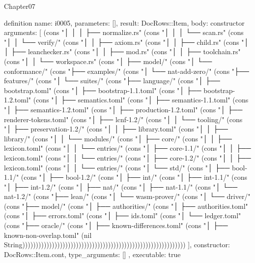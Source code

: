 \begin{lexlean}{Chapter07}
\begin{semanticmodule}
definition{
  name: i0005,
  parameters: [],
  result: DocRows::Item,
  body: constructor{
    arguments: [
      (cons "│   │       │   ├── normalize.rs" (cons "│   │       │   └── scan.rs" (cons "│   │       └── verify/" (cons "│   │           ├── axiom.rs" (cons "│   │           ├── child.rs" (cons "│   │           ├── leanchecker.rs" (cons "│   │           ├── mod.rs" (cons "│   │           ├── toolchain.rs" (cons "│   │           └── workspace.rs" (cons "│   ├── model/" (cons "│   └── conformance/" (cons "├── examples/" (cons "│   └── nat-add-zero/" (cons "├── features/" (cons "│   └── suites/" (cons "├── language/" (cons "│   ├── bootstrap.toml" (cons "│   ├── bootstrap-1.1.toml" (cons "│   ├── bootstrap-1.2.toml" (cons "│   ├── semantics.toml" (cons "│   ├── semantics-1.1.toml" (cons "│   ├── semantics-1.2.toml" (cons "│   ├── production-1.2.toml" (cons "│   ├── renderer-tokens.toml" (cons "│   ├── lcnf-1.2/" (cons "│   │   └── tooling/" (cons "│   ├── preservation-1.2/" (cons "│   │   ├── library.toml" (cons "│   │   ├── library/" (cons "│   │   └── modules/" (cons "│   ├── core/" (cons "│   │   ├── lexicon.toml" (cons "│   │   └── entries/" (cons "│   ├── core-1.1/" (cons "│   │   ├── lexicon.toml" (cons "│   │   └── entries/" (cons "│   ├── core-1.2/" (cons "│   │   ├── lexicon.toml" (cons "│   │   └── entries/" (cons "│   └── std/" (cons "│       ├── bool-1.1/" (cons "│       ├── bool-1.2/" (cons "│       ├── int/" (cons "│       ├── int-1.1/" (cons "│       ├── int-1.2/" (cons "│       ├── nat/" (cons "│       ├── nat-1.1/" (cons "│       └── nat-1.2/" (cons "├── lean/" (cons "│   └── wasm-prover/" (cons "│       └── driver/" (cons "├── model/" (cons "│   ├── authorities/" (cons "│   ├── authorities.toml" (cons "│   ├── errors.toml" (cons "│   ├── ids.toml" (cons "│   └── ledger.toml" (cons "├── oracle/" (cons "│   ├── known-differences.toml" (cons "│   ├── known-non-overlap.toml" (nil String)))))))))))))))))))))))))))))))))))))))))))))))))))))))))))))
    ],
    constructor: DocRows::Item.cont,
    type_arguments: []
  },
  executable: true
}


\end{semanticmodule}
\end{lexlean}
